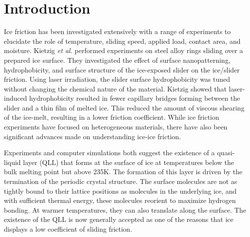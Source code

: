 \section{Introduction}

Ice friction has been investigated extensively with a range
of experiments to elucidate the role of
temperature,\cite{Bowden1939,Evans1976,Roberts1981,Derjaguin1988,Liang2003,Higgins2008} sliding speed,\cite{Evans1976,Derjaguin1988,Liang2003} applied
load,\cite{Bowden1939,Oksanen1982,Derjaguin1988,Buhl2001,Baurle2006}
contact area,\cite{Bowden1939,Baurle2007} and
moisture.\cite{Calabrese1980} Kietzig \textit{et al.} performed
experiments on steel alloy rings sliding over a prepared ice
surface.\cite{Kietzig2009} They investigated the effect of surface
nanopatterning, hydrophobicity, and surface structure of the
ice-exposed slider on the ice/slider friction.
Using laser irradiation, the slider surface hydrophobicity was tuned
without changing the chemical nature of the material. Kietzig showed
that laser-induced hydrophobicity resulted in fewer capillary bridges
forming between the slider and a thin film of melted ice. This reduced
the amount of viscous shearing of the ice-melt, resulting in a lower
friction coefficient.
While ice friction experiments have focused on heterogeneous
materials,\cite{Bowden1939,Evans1976,Derjaguin1988,Liang2003,Liang2005,Baurle2006,Baurle2007,Kietzig2009,Kietzig2010}
there have also been significant advances made on understanding
ice-ice
friction.\cite{Oksanen1982,Kennedy2000,Maeno2004,Fortt2007,Fortt2011,Lishman2011,Samadashvili2013}

Experiments and computer simulations both suggest the existence of a
quasi-liquid layer (QLL) that forms at the surface of ice at
temperatures below the bulk melting point but above
235K.\cite{Kroes1992,Ikeda-Fukazawa2004,Picaud2006,Conde2008,Bartels-Rausch2014,Sancheza2017}
The formation of this layer is driven by the termination of the
periodic crystal structure. The surface molecules are not as tightly
bound to their lattice positions as molecules in the underlying ice,
and with sufficient thermal energy, these molecules reorient to
maximize hydrogen bonding. At warmer temperatures, they can also
translate along the surface.\cite{Pfalzgraff2011,Bartels-Rausch2014}
The existence of the QLL is now generally accepted as one of the
reasons that ice displays a low coefficient of sliding
friction.\cite{Dash1995,Rosenberg2005,Dash2006,Malenkov2009}

